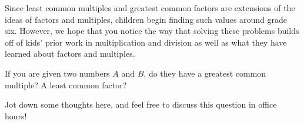 \documentclass{ximera}
\begin{document}
Since least common multiples and greatest common factors are extensions of the ideas of factors and multiples, children begin finding such values around grade six. However, we hope that you notice the way that solving these problems builds off of kids' prior work in multiplication and division as well as what they have learned about factors and multiples.


\begin{question}
If you are given two numbers $A$ and $B$, do they have a greatest common multiple? A least common factor? 
\begin{freeResponse}
Jot down some thoughts here, and feel free to discuss this question in office hours!
\end{freeResponse}
\end{question}
\end{document}
